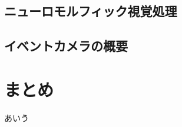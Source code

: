 \documentclass[a4paper,10.5pt,dvipdfmx]{bxjsarticle}
\begin{document}
\begin{multicols}{2}
\subsection{ニューロモルフィック視覚処理}
\subsection{イベントカメラの概要}

\subsection{}
\section{まとめ}
あいう




\end{multicols}
\end{document}
